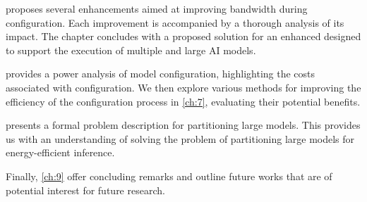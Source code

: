  proposes several \confignoc{} enhancements aimed at improving bandwidth during configuration.
Each improvement is accompanied by a thorough analysis of its impact.
The chapter concludes with a proposed solution for an enhanced \confignoc{} designed to support the execution of multiple and large AI models.

 provides a power analysis of model configuration, highlighting the costs associated with configuration. 
We then explore various methods for improving the efficiency of the configuration process in \cref{ch:7}, evaluating their potential benefits.

 presents a formal problem description for partitioning large models.
This provides us with an understanding of solving the problem of partitioning large models for energy-efficient inference.

Finally, \cref{ch:9} offer concluding remarks and outline future works that are of potential interest for future research.




